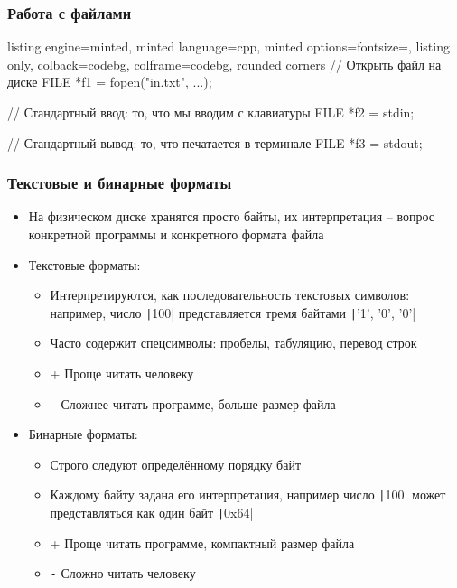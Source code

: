 \documentclass[10pt]{beamer}
\begin{document}
\begin{frame}[fragile]
\frametitle{Работа с файлами}
\begin{tcblisting}{listing engine=minted, minted language=cpp, minted options={fontsize=\scriptsize}, listing only, colback=codebg, colframe=codebg, rounded corners}
// Открыть файл на диске
FILE *f1 = fopen("in.txt", ...);

// Стандартный ввод: то, что мы вводим с клавиатуры
FILE *f2 = stdin;

// Стандартный вывод: то, что печатается в терминале
FILE *f3 = stdout;
\end{tcblisting}
\end{frame}

\begin{frame}[fragile]
\frametitle{Текстовые и бинарные форматы}
\begin{itemize}
\item На физическом диске хранятся просто байты, их интерпретация -- вопрос конкретной программы и конкретного формата файла
\pause
\item Текстовые форматы:
\pause
\begin{itemize}
\item Интерпретируются, как последовательность текстовых символов: например, число \texttt|100| представляется тремя байтами \texttt|'1', '0', '0'|
\pause
\item Часто содержит спецсимволы: пробелы, табуляцию, перевод строк
\pause
\item {\color{green}+} Проще читать человеку
\pause
\item {\color{red}\texttt{-}} Сложнее читать программе, больше размер файла
\end{itemize}
\pause
\item Бинарные форматы:
\pause
\begin{itemize}
\item Строго следуют определённому порядку байт
\pause
\item Каждому байту задана его интерпретация, например число \texttt|100| может представляться как один байт \texttt|0x64|
\pause
\item {\color{green}+} Проще читать программе, компактный размер файла
\pause
\item {\color{red}\texttt{-}} Сложно читать человеку
\end{itemize}
\end{itemize}
\end{frame}
\end{document}
